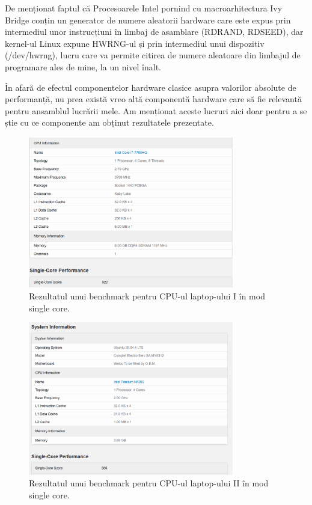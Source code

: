 De menționat faptul că Procesoarele Intel pornind cu macroarhitectura Ivy Bridge conțin un generator de numere aleatorii hardware care este expus prin intermediul unor instrucțiuni în limbaj de asamblare (RDRAND, RDSEED), dar kernel-ul Linux expune HWRNG-ul și prin intermediul unui dispozitiv (/dev/hwrng), lucru care va permite citirea de numere aleatoare din limbajul de programare ales de mine, la un nivel înalt. 


În afară de efectul componentelor hardware clasice asupra valorilor absolute de performanță, nu prea există vreo altă componentă hardware care să fie relevantă pentru ansamblul lucrării mele. Am menționat aceste lucruri aici doar pentru a se știe cu ce componente am obținut rezultatele prezentate.
\begin{figure}[H]
    \centering
    \includegraphics[width=0.8\textwidth]{continut/capitol2/figuri/BenchmarkLenovo.png}
    \caption{Rezultatul unui benchmark pentru CPU-ul laptop-ului I în mod single core.}
    \label{fig:BenchmarkLenovo}
\end{figure}

\begin{figure}[H]
    \centering
    \includegraphics[width=0.8\textwidth]{continut/capitol2/figuri/BenchmarkMyria.png}
    \caption{Rezultatul unui benchmark pentru CPU-ul laptop-ului II în mod single core.}
    \label{fig:BenchmarkMyria}
\end{figure}

